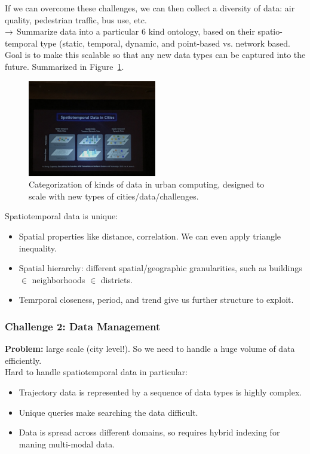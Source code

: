 If we can overcome these challenges, we can then collect a diversity of data: air quality, pedestrian traffic, bus use, etc. \\

$\rightarrow$ Summarize data into a particular 6 kind ontology, based on their spatio-temporal type (static, temporal, dynamic, and point-based vs. network based. Goal is to make this scalable so that any new data types can be captured into the future. Summarized in Figure~\ref{fig:data_type}.

\begin{figure}[h!]
    \centering
    \includegraphics[width=0.5\textwidth]{images/data_type.JPG}
    \caption{Categorization of kinds of data in urban computing, designed to scale with new types of cities/data/challenges.}
    \label{fig:data_type}
\end{figure}

Spatiotemporal data is unique:
\begin{itemize}
    \item Spatial properties like distance, correlation. We can even apply triangle inequality.
    \item Spatial hierarchy: different spatial/geographic granularities, such as buildings $\in$ neighborhoods $\in$ districts.
    \vspace{2mm}
    \item Temrporal closeness, period, and trend give us further structure to exploit.
\end{itemize}

\subsubsection{Challenge 2: Data Management}

{\bf Problem:} large scale (city level!). So we need to handle a huge volume of data efficiently. \\

Hard to handle spatiotemporal data in particular:
\begin{itemize}
    \item Trajectory data is represented by a sequence of data types is highly complex.
    \item Unique queries make searching the data difficult.
    \item Data is spread across different domains, so requires hybrid indexing for maning multi-modal data.
\end{itemize}

